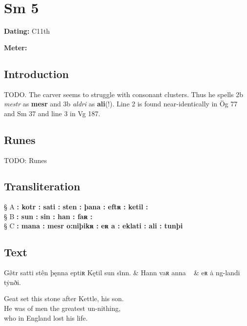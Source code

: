 \sectionline\clearpage


\section{Sm 5}

\begin{flushright}%
\textbf{Dating:} C11th

\textbf{Meter:} \Fornyrdislag
\end{flushright}%

\subsection{Introduction}

TODO.
The carver seems to struggle with consonant clusters.  Thus he spells 2b \emph{mestr} as \textbf{mesr} and 3b \emph{aldri} as \textbf{ali}(!).  Line 2 is found near-identically in Ög 77 and Sm 37 and line 3 in Vg 187.

\subsection{Runes}

TODO: Runes%

\subsection{Transliteration}

§ A \textbf{: kotr : sati : sten : þana : eftʀ : ketil :} \\
§ B \textbf{: sun : sin : han : faʀ :} \\
§ C \textbf{: mana : mesr o:niþikʀ : eʀ a : eklati : ali : tunþi}

\subsection{Text}

\bvg\bva[]%
Gø̂tr satti stên þęnna eptiʀ Kętil sun si̇nn. &
Hann vaʀ anna \hld\  &
eʀ ȧ ng-landi \hld\  tẏnði.\eva

\bvb Geat set this stone after Kettle, his son. \\
He was of men the greatest un-nithing, \\
who in England lost his life.\evb\evg

